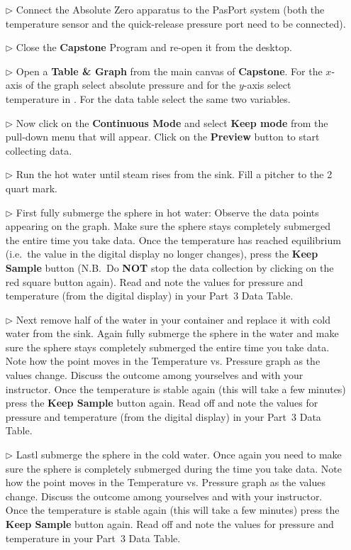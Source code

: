 \begin{itemize}
\item[$\triangleright$] Connect the Absolute Zero apparatus to the PasPort system (both the temperature sensor and the quick-release pressure port need to be connected).
\item[$\triangleright$] Close the \textbf{Capstone} Program and re-open it from the desktop.
\item[$\triangleright$] Open a {\bf Table \& Graph} from the main canvas of \textbf{Capstone}. For the $x$-axis of the graph select absolute pressure and for the $y$-axis select temperature in \celsius. For the data table select the same two variables.
\item[$\triangleright$] Now click on the \textbf{Continuous Mode} and select \textbf{Keep mode} from the pull-down menu that will appear. Click on the \textbf{Preview} button to start collecting data.
\item[$\triangleright$] Run the hot water until steam rises from the sink. Fill a pitcher to the 2 quart mark. 
\item[$\triangleright$] First fully submerge the sphere in hot water: Observe the data points appearing on the graph. Make sure the sphere stays completely submerged the entire time you take data. Once the temperature has reached equilibrium (i.e.\ the value in the digital display no longer changes), press the \textbf{Keep Sample} button (N.B.\ Do \textbf{NOT} stop the data collection by clicking on the red square button again). Read and note the values for pressure and temperature (from the digital display) in  your Part~3 Data Table.
\item[$\triangleright$] Next remove half of the water in your container and replace it with cold water from the sink. Again fully submerge the sphere in the water and make sure the sphere stays completely submerged the entire time you take data. Note how the point moves in the Temperature vs. Pressure graph as the values change. Discuss the outcome among yourselves and with your instructor. Once the temperature is stable again (this will take a few minutes) press the \textbf{Keep Sample} button again. Read off and note the values for pressure and temperature (from the digital display) in your Part~3 Data Table.
\item[$\triangleright$] Lastl submerge the sphere in the cold water. Once again you need to make sure the sphere is completely submerged during the time you take data. Note how the point moves in the Temperature vs. Pressure graph as the values change. Discuss the outcome among yourselves and with your instructor. Once the temperature is stable again (this will take a few minutes) press the \textbf{Keep Sample} button again. Read off and note the values for pressure and temperature in your Part~3 Data Table.

\end{itemize}
